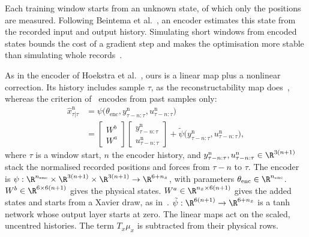 Each training window starts from an unknown state, of which only the
positions are measured.
Following Beintema et al.~\cite{beintema2023subnet}, an encoder estimates this
state from the recorded input and output history.
Simulating short windows from encoded states bounds the cost of a gradient
step and makes the optimisation more stable than simulating whole
records~\cite[Secs.~2, 3]{beintema2023subnet}.

As in the encoder of Hoekstra et al.~\cite[Eq.~(8)]{hoekstra2026encoder}, ours
is a linear map plus a nonlinear correction.
Its history includes sample $\tau$, as the reconstructability map
does~\cite[Eqs.~(11) to (17)]{hoekstra2026encoder}, whereas the criterion
of~\cite[Eq.~(22e)]{hoekstra2026lfr} encodes from past samples only:
\begin{equation}
\begin{aligned}
 \hat x^{\mathrm n}_{\tau|\tau}
 &=\psi\bigl(\theta_{\mathrm{enc}},y^{\mathrm n}_{\tau-n:\tau},u^{\mathrm n}_{\tau-n:\tau}\bigr)\\
 &=\begin{bmatrix}W^b\\ W^a\end{bmatrix}
   \begin{bmatrix}y^{\mathrm n}_{\tau-n:\tau}\\ u^{\mathrm n}_{\tau-n:\tau}\end{bmatrix}
   +\tilde\psi\bigl(y^{\mathrm n}_{\tau-n:\tau},u^{\mathrm n}_{\tau-n:\tau}\bigr),
\end{aligned}
\label{eq:aug_encoder}
\end{equation}
where $\tau$ is a window start, $n$ the encoder history, and
$y^{\mathrm n}_{\tau-n:\tau},u^{\mathrm n}_{\tau-n:\tau}\in\R^{3(n+1)}$ stack
the normalised recorded positions and forces from $\tau-n$ to $\tau$.
The encoder is
$\psi:\R^{n_{\mathrm{enc}}}\times\R^{3(n+1)}\times\R^{3(n+1)}\to
\R^{6+n_{\bar x}}$, with parameters
$\theta_{\mathrm{enc}}\in\R^{n_{\mathrm{enc}}}$.
$W^b\in\R^{6\times6(n+1)}$ gives the physical states.
$W^a\in\R^{n_{\bar x}\times6(n+1)}$ gives the added states and starts from a
Xavier draw, as in~\cite[Eq.~(31)]{hoekstra2026lfr}.
$\tilde\psi:\R^{6(n+1)}\to\R^{6+n_{\bar x}}$ is a tanh network whose output
layer starts at zero.
The linear maps act on the scaled, uncentred histories.
The term $T_x\mu_x$ is subtracted from their physical rows.

